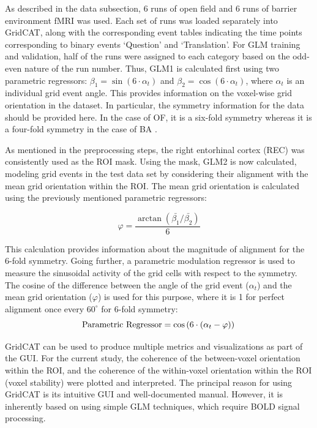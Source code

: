 \documentclass[a4paper]{article}
\begin{document}
As described in the data subsection, 6 runs of open field and 6 runs of barrier environment fMRI was used. Each set of runs was loaded separately into GridCAT, along with the corresponding event tables indicating the time points corresponding to binary events ‘Question’ and ‘Translation’. For GLM training and validation, half of the runs were assigned to each category based on the odd-even nature of the run number. Thus, GLM1 is calculated first using two parametric regressors:  $ \beta_1 = \sin(6 \cdot \alpha_t)$ and  $\beta_2 = \cos(6 \cdot \alpha_t)$, where $\alpha_t$ is an individual grid event angle. This provides information on the voxel-wise grid orientation in the dataset. In particular, the symmetry information for the data should be provided here. In the case of OF, it is a six-fold symmetry whereas it is a four-fold symmetry in the case of BA \cite{he_environmental_2019}. 

As mentioned in the preprocessing steps, the right entorhinal cortex (REC) was consistently used as the ROI mask. Using the mask, GLM2 is now calculated, modeling grid events in the test data set by considering their alignment with the mean grid orientation within the ROI. The mean grid orientation is calculated using the previously mentioned parametric regressors: 

\begin{equation}
\text{$\varphi$} = \frac{\arctan(\bar{\beta_1}/\bar{\beta_2})}{6}
\end{equation}

\noindent This calculation provides information about the magnitude of alignment for the 6-fold symmetry. Going further, a parametric modulation regressor is used to measure the sinusoidal activity of the grid cells with respect to the symmetry. The cosine of the difference between the angle of the grid event ($\alpha_t$) and the mean grid orientation ($\varphi$) is used for this purpose, where it is 1 for perfect alignment once every $60^{\circ}$ for 6-fold symmetry: 
\begin{equation}
\text{Parametric Regressor} = \cos\left( 6 \cdot (\alpha_t - \varphi) \right) \\
\end{equation}


\noindent GridCAT can be used to produce multiple metrics and visualizations as part of the GUI. For the current study, the coherence of the between-voxel orientation within the ROI, and the coherence of the within-voxel orientation within the ROI (voxel stability) were plotted and interpreted. The principal reason for using GridCAT is its intuitive GUI and well-documented manual. However, it is inherently based on using simple GLM techniques, which require BOLD signal processing. 
\end{document}
